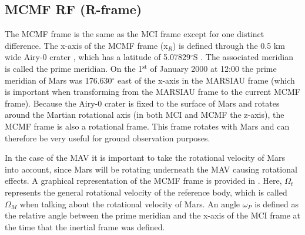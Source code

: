  




\subsection{\acl{MCMF} \ac{RF} (R-frame)}
\label{subsec:ECEF}
The \acf{MCMF} frame is the same as the \ac{MCI} frame except for one distinct difference. The x-axis of the \ac{MCMF} frame (x$_{R}$) is defined through the 0.5 km wide Airy-0 crater \citep{morton2003mapping}, which has a latitude of 5.07829$^{\circ}$S \citep{duxbury2014location}. The associated meridian is called the prime meridian. On the 1$^{\text{st}}$ of January 2000 at 12:00 the prime meridian of Mars was 176.630$^{\circ}$ east of the x-axis in the MARSIAU frame (which is important when transforming from the MARSIAU frame to the current \ac{MCMF} frame)\citep{diaz2008generic,archinal2011report}. Because the Airy-0 crater is fixed to the surface of Mars and rotates around the Martian rotational axis (in both \ac{MCI} and \ac{MCMF} the z-axis), the \ac{MCMF} frame is also a rotational frame. This frame rotates with Mars and can therefore be very useful for ground observation purposes. 

In the case of the \ac{MAV} it is important to take the rotational velocity of Mars into account, since Mars will be rotating underneath the \ac{MAV} causing rotational effects. A graphical representation of the \ac{MCMF} frame is provided in . Here, $\Omega_{t}$ represents the general rotational velocity of the reference body, which is called $\Omega_{M}$ when talking about the rotational velocity of Mars. An angle $\omega_{P}$ is defined as the relative angle between the prime meridian and the x-axis of the \ac{MCI} frame at the time that the inertial frame was defined.






